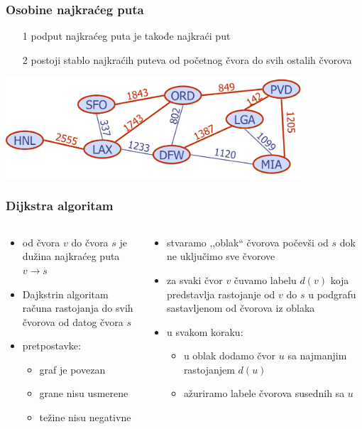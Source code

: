 \documentclass[compress]{beamer}
\begin{document}
\begin{frame}[fragile]
  \frametitle{Osobine najkraćeg puta}
  \begin{itemize}
    \item[1] podput najkraćeg puta je takođe najkraći put
    \item[2] postoji stablo najkraćih puteva od početnog čvora do svih
      ostalih čvorova
  \end{itemize}
  \begin{center}
    \includegraphics[width=11cm]{asp-14-pic60.png}
  \end{center}
\end{frame}

\begin{frame}[fragile]
  \frametitle{Dijkstra algoritam}
  \begin{columns}
    \begin{column}[t]{6cm}
      \begin{itemize}
        \item {} od čvora $v$ do čvora $s$ je dužina 
          najkraćeg puta $v \rightarrow s$
        \item Dajkstrin algoritam računa rastojanja do svih čvorova od
          datog čvora $s$
        \item pretpostavke:
        \begin{itemize}
          \item graf je povezan
          \item grane nisu usmerene
          \item težine nisu negativne
        \end{itemize}
      \end{itemize}
    \end{column}
    \begin{column}[t]{6cm}
      \begin{itemize}
        \item stvaramo ,,oblak`` čvorova počevši od $s$ dok ne uključimo
          sve čvorove
        \item za svaki čvor $v$ čuvamo labelu $d(v)$ koja predstavlja
          rastojanje od $v$ do $s$ u podgrafu sastavljenom od čvorova iz
          oblaka
        \item u svakom koraku:
        \begin{itemize}
          \item u oblak dodamo čvor $u$ sa najmanjim rastojanjem $d(u)$
          \item ažuriramo labele čvorova susednih sa $u$
        \end{itemize}
      \end{itemize}
    \end{column}
  \end{columns}
\end{frame}
\end{document}
